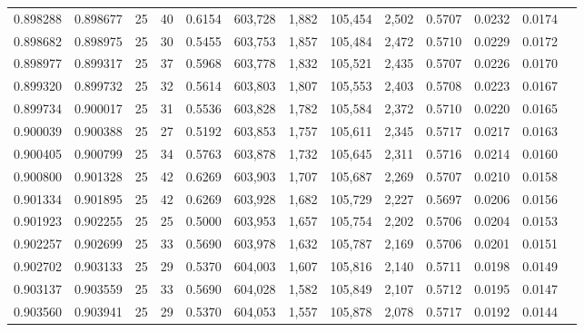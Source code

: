 \begin{tabular}{rrrrrrrrrrrrr}
0.898288 & 0.898677 &    25 &  40 &                                     0.6154 & 603,728 &   1,882 & 105,454 &   2,502 & 0.5707 & 0.0232 & 0.0174 \\
0.898682 & 0.898975 &    25 &  30 &                                     0.5455 & 603,753 &   1,857 & 105,484 &   2,472 & 0.5710 & 0.0229 & 0.0172 \\
0.898977 & 0.899317 &    25 &  37 &                                     0.5968 & 603,778 &   1,832 & 105,521 &   2,435 & 0.5707 & 0.0226 & 0.0170 \\
0.899320 & 0.899732 &    25 &  32 &                                     0.5614 & 603,803 &   1,807 & 105,553 &   2,403 & 0.5708 & 0.0223 & 0.0167 \\
0.899734 & 0.900017 &    25 &  31 &                                     0.5536 & 603,828 &   1,782 & 105,584 &   2,372 & 0.5710 & 0.0220 & 0.0165 \\
0.900039 & 0.900388 &    25 &  27 &                                     0.5192 & 603,853 &   1,757 & 105,611 &   2,345 & 0.5717 & 0.0217 & 0.0163 \\
0.900405 & 0.900799 &    25 &  34 &                                     0.5763 & 603,878 &   1,732 & 105,645 &   2,311 & 0.5716 & 0.0214 & 0.0160 \\
0.900800 & 0.901328 &    25 &  42 &                                     0.6269 & 603,903 &   1,707 & 105,687 &   2,269 & 0.5707 & 0.0210 & 0.0158 \\
0.901334 & 0.901895 &    25 &  42 &                                     0.6269 & 603,928 &   1,682 & 105,729 &   2,227 & 0.5697 & 0.0206 & 0.0156 \\
0.901923 & 0.902255 &    25 &  25 &                                     0.5000 & 603,953 &   1,657 & 105,754 &   2,202 & 0.5706 & 0.0204 & 0.0153 \\
0.902257 & 0.902699 &    25 &  33 &                                     0.5690 & 603,978 &   1,632 & 105,787 &   2,169 & 0.5706 & 0.0201 & 0.0151 \\
0.902702 & 0.903133 &    25 &  29 &                                     0.5370 & 604,003 &   1,607 & 105,816 &   2,140 & 0.5711 & 0.0198 & 0.0149 \\
0.903137 & 0.903559 &    25 &  33 &                                     0.5690 & 604,028 &   1,582 & 105,849 &   2,107 & 0.5712 & 0.0195 & 0.0147 \\
0.903560 & 0.903941 &    25 &  29 &                                     0.5370 & 604,053 &   1,557 & 105,878 &   2,078 & 0.5717 & 0.0192 & 0.0144 \\

\end{tabular}

